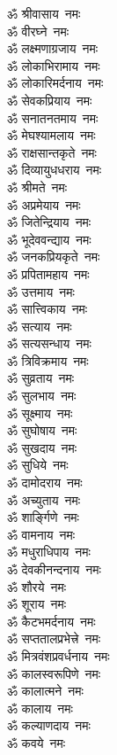 \begin{multicols}{2}
\begin{flushleft}
ॐ श्रीवासाय~नमः\\
ॐ वीरघ्ने~नमः\hfill{}\\
ॐ लक्ष्मणाग्रजाय~नमः\\
ॐ लोकाभिरामाय~नमः\\
ॐ लोकारिमर्दनाय~नमः\\
ॐ सेवकप्रियाय~नमः\\
ॐ सनातनतमाय~नमः\\
ॐ मेघश्यामलाय~नमः\\
ॐ राक्षसान्तकृते~नमः\\
ॐ दिव्यायुधधराय~नमः\\
ॐ श्रीमते~नमः\\
ॐ अप्रमेयाय~नमः\hfill{}\\
ॐ जितेन्द्रियाय~नमः\\
ॐ भूदेववन्द्याय~नमः\\
ॐ जनकप्रियकृते~नमः\\
ॐ प्रपितामहाय~नमः\\
ॐ उत्तमाय~नमः\\
ॐ सात्त्विकाय~नमः\\
ॐ सत्याय~नमः\\
ॐ सत्यसन्धाय~नमः\\
ॐ त्रिविक्रमाय~नमः\\
ॐ सुव्रताय~नमः\hfill{}\\
ॐ सुलभाय~नमः\\
ॐ सूक्ष्माय~नमः\\
ॐ सुघोषाय~नमः\\
ॐ सुखदाय~नमः\\
ॐ सुधिये~नमः\\
ॐ दामोदराय~नमः\\
ॐ अच्युताय~नमः\\
ॐ शार्ङ्गिणे~नमः\\
ॐ वामनाय~नमः\\
ॐ मधुराधिपाय~नमः\hfill{}\\
ॐ देवकीनन्दनाय~नमः\\
ॐ शौरये~नमः\\
ॐ शूराय~नमः\\
ॐ कैटभमर्दनाय~नमः\\
ॐ सप्ततालप्रभेत्त्रे~नमः\\
ॐ मित्रवंशप्रवर्धनाय~नमः\\
ॐ कालस्वरूपिणे~नमः\\
ॐ कालात्मने~नमः\\
ॐ कालाय~नमः\\
ॐ कल्याणदाय~नमः\hfill{}\\
ॐ कवये~नमः\\

\end{flushleft}
\end{multicols}
